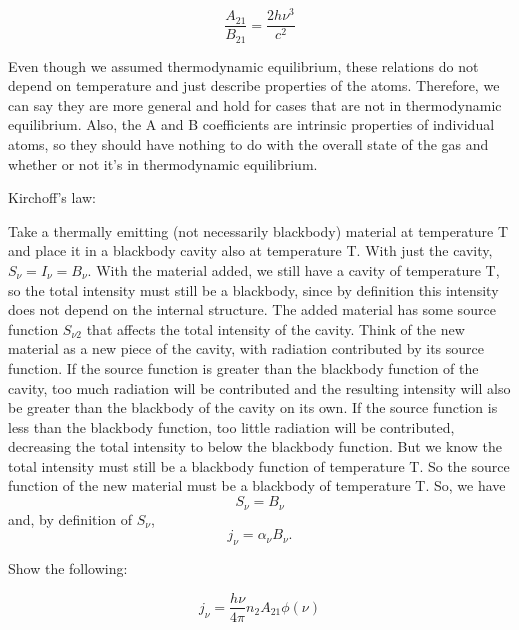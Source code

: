\begin{enumerate}
      \begin{equation}
      \frac{A_{21}}{B_{21}} = \frac{2 h \nu^3}{c^2}
      \end{equation}
      
      Even though we assumed thermodynamic equilibrium, these relations do not depend on temperature and just describe properties of the atoms. Therefore, we can say they are more general and hold for cases that are not in thermodynamic equilibrium.
      Also, the A and B coefficients are intrinsic properties of individual 
      atoms, so they should have nothing to do with the overall state of the 
      gas and whether or not it's in thermodynamic equilibrium.

      Kirchoff's law:

      Take a thermally emitting (not necessarily blackbody) material at temperature T and place it 
      in a blackbody cavity also at temperature T.  With just the cavity, $S_{\nu}=I_{\nu}=B_{\nu}$.  
      With the material added, we still have a cavity of temperature T, so the total intensity must 
      still be a blackbody, since by definition this intensity does not depend on the internal 
      structure.  The added material has some source function $S_{\nu 2}$ that affects the total 
      intensity of the cavity.  Think of the new material as a new piece of the cavity, with radiation 
      contributed by its source function.  If the source function is greater than the blackbody function 
      of the cavity, too much radiation will be contributed and the resulting intensity will also be 
      greater than the blackbody of the cavity on its own.  If the source function is less than the 
      blackbody function, too little radiation will be contributed, decreasing the total intensity to 
      below the blackbody function.  But we know the total intensity must still be a blackbody function 
      of temperature T.  So the source function of the new material must be a blackbody of temperature T.  
      So, we have 
      \begin{displaymath}S_{\nu}=B_{\nu}\end{displaymath}
      and, by definition of $S_{\nu}$,
      \begin{equation}
      j_\nu = \alpha_\nu B_\nu.
      \end{equation}
      
      Show the following:
      
      \begin{equation}
      j_\nu = \frac{h \nu}{4 \pi} n_2 A_{21} \phi(\nu)
      \end{equation}
      

\end{enumerate}

